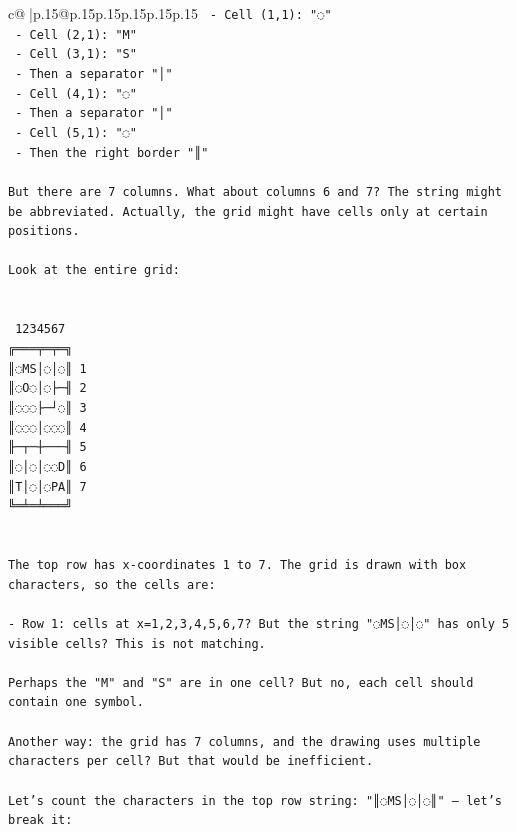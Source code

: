 \documentclass{article}
\begin{document}
{\begin{supertabular}{c@{$\;$}|p{.15\linewidth}@{}p{.15\linewidth}p{.15\linewidth}p{.15\linewidth}p{.15\linewidth}p{.15\linewidth}}
{{{\texttt{    {-} Cell (1,1): "◌"} \\
\texttt{    {-} Cell (2,1): "M"} \\
\texttt{    {-} Cell (3,1): "S"} \\
\texttt{    {-} Then a separator "│"} \\
\texttt{    {-} Cell (4,1): "◌"} \\
\texttt{    {-} Then a separator "│"} \\
\texttt{    {-} Cell (5,1): "◌"} \\
\texttt{    {-} Then the right border "║"} \\
\\ 
\texttt{But there are 7 columns. What about columns 6 and 7? The string might be abbreviated. Actually, the grid might have cells only at certain positions.} \\
\\ 
\texttt{Look at the entire grid:} \\
\\ 
\\ 
\texttt{ 1234567} \\
\texttt{╔═══╤═╤═╗} \\
\texttt{║◌MS│◌│◌║ 1} \\
\texttt{║◌O◌│◌├─╢ 2} \\
\texttt{║◌◌◌├─┘◌║ 3} \\
\texttt{║◌◌◌│◌◌◌║ 4} \\
\texttt{╟─┬─┼───╢ 5} \\
\texttt{║◌│◌│◌◌D║ 6} \\
\texttt{║T│◌│◌PA║ 7} \\
\texttt{╚═╧═╧═══╝} \\
\\ 
\\ 
\texttt{The top row has x{-}coordinates 1 to 7. The grid is drawn with box characters, so the cells are:} \\
\\ 
\texttt{{-} Row 1: cells at x=1,2,3,4,5,6,7? But the string "◌MS│◌│◌" has only 5 visible cells? This is not matching.} \\
\\ 
\texttt{Perhaps the "M" and "S" are in one cell? But no, each cell should contain one symbol.} \\
\\ 
\texttt{Another way: the grid has 7 columns, and the drawing uses multiple characters per cell? But that would be inefficient.} \\
\\ 
\texttt{Let's count the characters in the top row string: "║◌MS│◌│◌║" — let's break it:} \\
}}}
\end{supertabular}}
\end{document}
